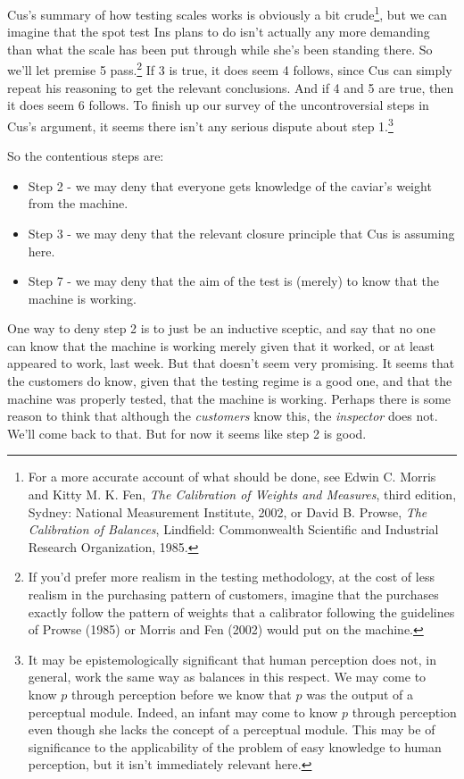 Cus's summary of how testing scales works is obviously a bit crude\footnote{For a more accurate account of what should be done, see Edwin C. Morris and Kitty M. K. Fen, \textit{The Calibration of Weights and Measures}, third edition, Sydney: National Measurement Institute, 2002, or David B. Prowse, \textit{The Calibration of Balances}, Lindfield: Commonwealth Scientific and Industrial Research Organization, 1985.}, but we can imagine that the spot test Ins plans to do isn't actually any more demanding than what the scale has been put through while she's been standing there. So we'll let premise 5 pass.\footnote{If you'd prefer more realism in the testing methodology, at the cost of less realism in the purchasing pattern of customers, imagine that the purchases exactly follow the pattern of weights that a calibrator following the guidelines of Prowse (1985) or Morris and Fen (2002) would put on the machine.} If 3 is true, it does seem 4 follows, since Cus can simply repeat his reasoning to get the relevant conclusions. And if 4 and 5 are true, then it does seem 6 follows. To finish up our survey of the uncontroversial steps in Cus's argument, it seems there isn't any serious dispute about step 1.\footnote{It may be epistemologically significant that human perception does not, in general, work the same way as balances in this respect. We may come to know $p$ through perception before we know that $p$ was the output of a perceptual module. Indeed, an infant may come to know $p$ through perception even though she lacks the concept of a perceptual module. This may be of significance to the applicability of the problem of easy knowledge to human perception, but it isn't immediately relevant here.}

So the contentious steps are:
\begin{itemize}
\item Step 2 - we may deny that everyone gets knowledge of the caviar's weight from the machine.
\item Step 3 - we may deny that the relevant closure principle that Cus is assuming here.
\item Step 7 - we may deny that the aim of the test is (merely) to know that the machine is working.
\end{itemize}

One way to deny step 2 is to just be an inductive sceptic, and say that no one can know that the machine is working merely given that it worked, or at least appeared to work, last week. But that doesn't seem very promising. It seems that the customers do know, given that the testing regime is a good one, and that the machine was properly tested, that the machine is working. Perhaps there is some reason to think that although the \textit{customers} know this, the \textit{inspector} does not. We'll come back to that. But for now it seems like step 2 is good.

